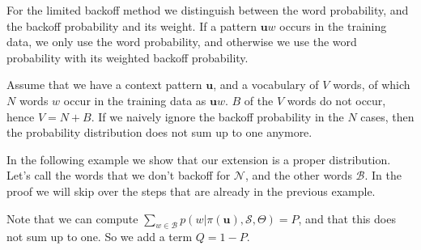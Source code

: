For the limited backoff method we distinguish between the word probability, and the backoff probability and its weight. If a pattern $\mathbf{u}w$ occurs in the training data, we only use the word probability, and otherwise we use the word probability with its weighted backoff probability.

Assume that we have a context pattern $\mathbf{u}$, and a vocabulary of $V$ words, of which $N$ words $w$ occur in the training data as $\mathbf{u}w$. $B$ of the $V$ words do not occur, hence $V = N + B$. 
If we naively ignore the backoff probability in the $N$ cases, then the probability distribution does not sum up to one anymore.

In the following example we show that our extension is a proper distribution. Let's call the words that we don't backoff for $\mathcal{N}$, and the other words $\mathcal{B}$. In the proof we will skip over the steps that are already in the previous example.

Note that we can compute $\sum_{w\in\mathcal{B}} p(w|\pi(\mathbf{u}), \mathcal{S}, \Theta) = P$, and that this does not sum up to one. So we add a term $Q = 1 - P$.

